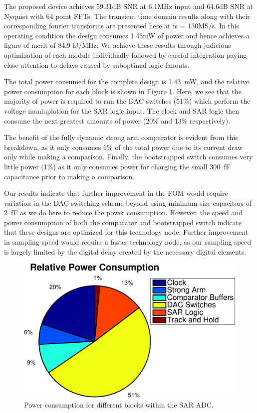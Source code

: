 \documentclass[10pt,journal]{IEEEtran}\usepackage{longtable}
\begin{document}
The proposed device achieves 59.31dB SNR at 6.1MHz input and 64.6dB SNR at Nyquist with 64 point FFTs.
The transient time domain results along with their corresponding fourier transforms are presented here at fs = 130MS/s.
In this operating condition the design consumes 1.43mW of power and hence achieves a figure of merit of 84.9 fJ/MHz.
We achieve these results through judicious optimization of each module individually followed by careful integration paying close attention to delays caused by suboptimal logic fanouts.



The total power consumed for the complete design is \SI{1.43}{\milli\watt}, and the relative power consumption for each block is shown in Figure \ref{fig:Power}. Here, we see that the majority of power is required to run the DAC switches (51\%) which perform the voltage maniuplation for the SAR logic input. The clock and SAR logic then consume the next greatest amounts of power (20\% and 13\% respectively). 

The benefit of the fully dynamic strong arm comparator is evident from this breakdown, as it only consumes 6\% of the total power due to its current draw only while making a comparison. Finally, the bootstrapped switch consumes very little power (1\%) as it only consumes power for charging the small \SI{300}{\femto\farad} capacitance prior to making a comparison.

Our results indicate that further improvement in the FOM would require variation in the DAC switching scheme beyond using minimum size capacitors of \SI{2}{\femto\farad} as we do here to reduce the power consumption. However, the speed and power consumption of both the comparator and bootstrapped switch indicate that these designs are optimized for this technology node. Further improvement in sampling speed would require a faster technology node, as our sampling speed is largely limited by the digital delay created by the necessary digital elements. 

\begin{figure}[t]
\begin{center}
\includegraphics[width=1\columnwidth]{PowerConsumption.pdf}
\caption{Power consumption for different blocks within the SAR ADC.}
\label{fig:Power}
\end{center}
\end{figure}
\end{document}
